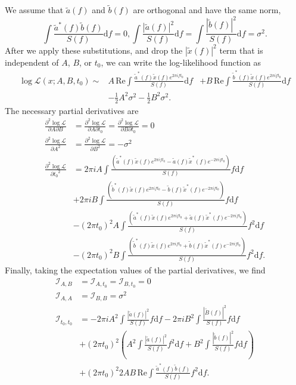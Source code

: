 \documentclass{iopart}
\begin{document}
%
We assume that $\tilde{a}(f)$ and $\tilde{b}(f)$ are orthogonal and have the same norm,
%
\begin{equation}
	\int \frac{\tilde{a}^*(f) \tilde{b}(f)}{S(f)} \mathrm{d}f = 0,
	\int \frac{|\tilde{a}(f)|^2}{S(f)} \mathrm{d}f =
	\int \frac{|\tilde{b}(f)|^2}{S(f)} \mathrm{d}f =
	\sigma^2.
\end{equation}
%
After we apply these substitutions, and drop the $|\tilde{x}(f)|^2$ term that is independent of $A$, $B$, or $t_0$, we can write the log\nobreakdashes-likelihood function as
%
\begin{eqnarray}\label{eq:trigger-likelihood-simplified}
	\log \mathcal{L}(x; A, B, t_0) \sim
	& A \, \mathrm{Re} \int \frac{\tilde{a}^*(f) \tilde{x}(f) e^{2 \pi i f t_0}}{S(f)} \mathrm{d}f 
	&+ B \, \mathrm{Re} \int \frac{\tilde{b}^*(f) \tilde{x}(f) e^{2 \pi i f t_0} }{S(f)} \mathrm{d}f\nonumber\\
	&- \frac{1}{2} A^2 \sigma^2 - \frac{1}{2} B^2 \sigma^2.
\end{eqnarray}
%
The necessary partial derivatives are
%
\begin{eqnarray*}
	\frac{\partial^2 \log \mathcal{L}}{\partial A \partial B} &=
	\frac{\partial^2 \log \mathcal{L}}{\partial A \partial t_0} =
	\frac{\partial^2 \log \mathcal{L}}{\partial B \partial t_0} = 0 \\
	\frac{\partial^2 \log \mathcal{L}}{\partial A^2} &=
	\frac{\partial^2 \log \mathcal{L}}{\partial B^2} = - \sigma^2 \\
	\frac{\partial^2 \log \mathcal{L}}{\partial {t_0}^2} &=
	2 \pi i A \int \frac{\left(\tilde{a}^*(f) \tilde{x}(f) e^{2 \pi i f t_0} - \tilde{a}(f) \tilde{x}^*(f) e^{-2 \pi i f t_0}\right)}{S(f)} f \mathrm{d}f \\
	&+ 2 \pi i B \int \frac{\left(\tilde{b}^*(f) \tilde{x}(f) e^{2 \pi i f t_0} - \tilde{b}(f) \tilde{x}^*(f) e^{-2 \pi i f t_0}\right)}{S(f)} f \mathrm{d}f \\
	&- (2 \pi t_0)^2 A \int \frac{\left(\tilde{a}^*(f) \tilde{x}(f) e^{2 \pi i f t_0} + \tilde{a}(f) \tilde{x}^*(f) e^{-2 \pi i f t_0}\right)}{S(f)} f^2 \mathrm{d}f \\
	&- (2 \pi t_0)^2 B \int \frac{\left(\tilde{b}^*(f) \tilde{x}(f) e^{2 \pi i f t_0} + \tilde{b}(f) \tilde{x}^*(f) e^{-2 \pi i f t_0}\right)}{S(f)} f^2 \mathrm{d}f.
\end{eqnarray*}
%
Finally, taking the expectation values of the partial derivatives, we find
%
\begin{eqnarray*}
	\mathcal{I}_{A,B} &= \mathcal{I}_{A,t_0} = \mathcal{I}_{B,t_0} = 0 \\
	\mathcal{I}_{A,A} &= \mathcal{I}_{B,B} = \sigma^2 \\
	\mathcal{I}_{t_0,t_0} &=
	- 2 \pi i A^2 \int \frac{|\tilde{a}(f)|^2}{S(f)} f\mathrm{d}f
	- 2 \pi i B^2 \int \frac{|\tilde{B}(f)|^2}{S(f)} f\mathrm{d}f \\
	&+ (2 \pi t_0)^2 \left(A^2 \int \frac{|\tilde{a}(f)|^2}{S(f)} f^2\mathrm{d}f +
	B^2 \int \frac{|\tilde{b}(f)|^2}{S(f)} f\mathrm{d}f \right) \\
	&+ (2\pi t_0)^2 2 A B \, \mathrm{Re} \int \frac{\tilde{a}^*(f)\tilde{b}(f)}{S(f)} f^2\mathrm{d}f.
\end{eqnarray*}
\end{document}
